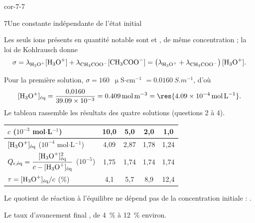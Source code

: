 \begin{blocLivre}{cor-7-7}
\begin{corrige}{7}{Une constante indépendante de l'état initial}
\begin{questions}
\item Les seuls ions présents en quantité notable sont  et , de même concentration ; la loi de
Kohlrausch donne
\[\sigma=\lambda_{\ce{H3O+}}[\ce{H3O+}]+\lambda_{\ce{CH3COO-}}[\ce{CH3COO-}]=\left(\lambda_{\ce{H3O+}}+\lambda_{\ce{CH3COO-}}\right)[\ce{H3O+}].\]
\item Pour la première solution, $\sigma=160$~$\upmu$S$\cdot$cm$^{-1}$ $=\qty{0,0160}{S.m^{-1}}$, d'où
\[[\ce{H3O+}]_\text{éq}=\frac{0{,}0160}{\num{39.09e-3}}=\qty{0,409}{mol.m^{-3}}=\res{\qty{4,09e-4}{mol.L^{-1}}}.\]
Le tableau rassemble les résultats des quatre solutions (questions 2 à 4).
\begin{center}\small\renewcommand{\arraystretch}{1.2}
\begin{tabular}{@{}l*{4}{c}@{}}\toprule
$c$ ($10^{-3}$ mol$\cdot$L$^{-1}$) & 10,0 & 5,0 & 2,0 & 1,0\\\midrule
$[\ce{H3O+}]_\text{éq}$ ($10^{-4}$ mol$\cdot$L$^{-1}$) & 4,09 & 2,87 & 1,78 & 1,24\\
$Q_{\mathrm{r},\text{éq}}=\dfrac{[\ce{H3O+}]_\text{éq}^2}{c-[\ce{H3O+}]_\text{éq}}$ ($10^{-5}$) & 1,75 & 1,74 & 1,74 & 1,74\\[1.5ex]
$\tau=[\ce{H3O+}]_\text{éq}/c$ (\%) & 4,1 & 5,7 & 8,9 & 12,4\\\bottomrule
\end{tabular}\end{center}
\item Le quotient de réaction à l'équilibre ne dépend pas de la concentration initiale : .
\item Le taux d'avancement final , de 4~\% à 12~\% environ.
\end{questions}
\end{corrige}
\end{blocLivre}
